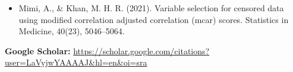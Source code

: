 \documentclass[10pt, letterpaper]{article}
\begin{document}
        \begin{itemize}
            \item Mimi, A., \& Khan, M. H. R. (2021). Variable selection for censored data using modified correlation adjusted correlation (mcar) scores. Statistics in Medicine, 40(23), 5046–5064.     
           

        \end{itemize}
        \textbf{Google Scholar:} \href{https://scholar.google.com/citations?user=LaVyjwYAAAAJ&hl=en&oi=sra}{https://scholar.google.com/citations?user=LaVyjwYAAAAJ\&hl=en\&oi=sra}
\end{document}
